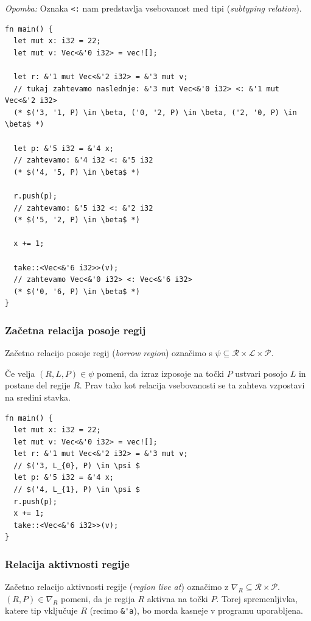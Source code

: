 \documentclass[a4paper,12pt,openright]{book}
\begin{document}
\textit{Opomba:} Oznaka \verb|<:| nam predstavlja vsebovanost med tipi (\textit{subtyping relation}).

\begin{lstlisting}
fn main() {
  let mut x: i32 = 22;
  let mut v: Vec<&'0 i32> = vec![];

  let r: &'1 mut Vec<&'2 i32> = &'3 mut v; 
  // tukaj zahtevamo naslednje: &'3 mut Vec<&'0 i32> <: &'1 mut Vec<&'2 i32> 
  (* $('3, '1, P) \in \beta, ('0, '2, P) \in \beta, ('2, '0, P) \in \beta$ *)

  let p: &'5 i32 = &'4 x; 
  // zahtevamo: &'4 i32 <: &'5 i32
  (* $('4, '5, P) \in \beta$ *)

  r.push(p);
  // zahtevamo: &'5 i32 <: &'2 i32
  (* $('5, '2, P) \in \beta$ *)

  x += 1;

  take::<Vec<&'6 i32>>(v);
  // zahtevamo Vec<&'0 i32> <: Vec<&'6 i32>
  (* $('0, '6, P) \in \beta$ *)
}
\end{lstlisting}

\subsubsection{Začetna relacija posoje regij}

Začetno relacijo posoje regij (\textit{borrow region}) označimo s $\psi \subseteq \mathcal{R} \times \mathcal{L} \times \mathcal{P}$.

Če velja $(R,L,P) \in \psi$ pomeni, da izraz izposoje na točki $P$ ustvari posojo $L$ in postane del
regije $R$. Prav tako kot relacija vsebovanosti se ta zahteva vzpostavi na sredini stavka.

\begin{lstlisting}
fn main() {
  let mut x: i32 = 22;
  let mut v: Vec<&'0 i32> = vec![];
  let r: &'1 mut Vec<&'2 i32> = &'3 mut v; 
  // $('3, L_{0}, P) \in \psi $
  let p: &'5 i32 = &'4 x; 
  // $('4, L_{1}, P) \in \psi $
  r.push(p);
  x += 1;
  take::<Vec<&'6 i32>>(v);
}
\end{lstlisting}

\subsubsection{Relacija aktivnosti regije}

Začetno relacijo aktivnosti regije (\textit{region live at}) označimo z $\nabla_{R} \subseteq \mathcal{R} \times \mathcal{P}$.
$(R, P) \in \nabla_{R}$ pomeni, da je regija $R$ aktivna na točki $P$. Torej spremenljivka, katere tip vključuje $R$ (recimo \verb|&'a|),
bo morda kasneje v programu uporabljena.
\end{document}
